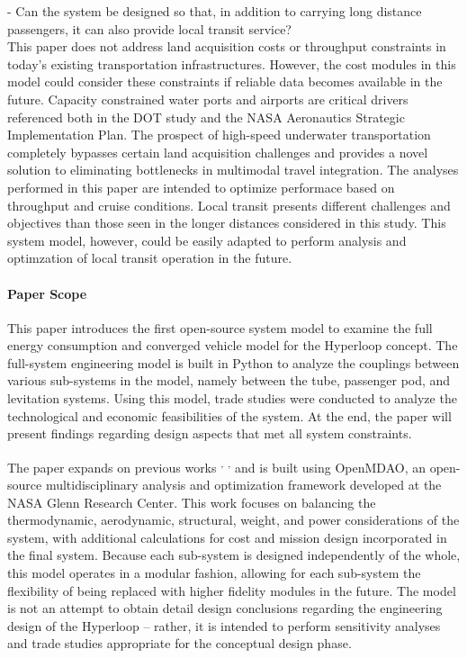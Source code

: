 	- Can the system be designed so that, in addition to carrying long distance
	passengers, it can also provide local transit service?\\

	This paper does not address land acquisition costs or throughput
	constraints in today's existing transportation infrastructures. However, the cost
	modules in this model could consider these constraints if reliable data becomes available in the future.
	Capacity constrained water ports and airports are critical drivers referenced
	both in the DOT study and the NASA Aeronautics Strategic
	Implementation Plan. The prospect of high-speed underwater transportation
	completely bypasses certain land acquisition challenges and provides a novel solution
	to eliminating bottlenecks in multimodal travel integration. The analyses performed in this paper
	are intended to optimize performace based on throughput and cruise conditions.
	Local transit presents different challenges and objectives than those seen in the longer distances
	considered in this study. This system model, however, could be easily adapted to perform
	analysis and optimzation of local transit operation in the future.\\

\paragraph{Paper Scope}
	This paper introduces the first open-source system model to examine the
	full energy consumption and converged vehicle model for the Hyperloop concept.
	The full-system engineering model is built in Python to analyze the couplings
	between various sub-systems in the model, namely between the tube, passenger pod, and
	levitation systems. Using this model, trade studies were conducted to analyze the technological
	and economic feasibilities of the system.
	At the end, the paper will present findings regarding design aspects that
	met all system constraints.

	The paper expands on previous works \cite{Chin} \textsuperscript{,}
	\cite{goodwin2009cantera}\textsuperscript{,} \cite{GrayBenchmarking2013}
	and is built using OpenMDAO, an open-source multidisciplinary analysis and optimization framework
	developed at the NASA Glenn Research Center.
	This work focuses on balancing the thermodynamic, aerodynamic, structural,
	weight, and power considerations of the system, with additional calculations for cost
	and mission design incorporated in the final system. Because each sub-system
	is designed independently of the whole, this model operates in a modular fashion, allowing
	for each sub-system the flexibility of being replaced with higher fidelity modules in the future.
	The model is not an attempt to obtain detail design conclusions regarding the
	engineering design of the Hyperloop -- rather, it is intended to perform sensitivity analyses and
	trade studies appropriate for the conceptual design phase.


